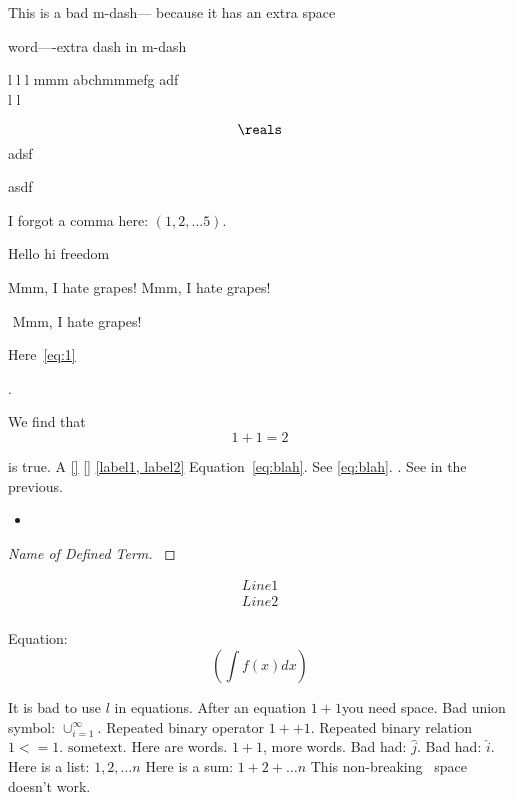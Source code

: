 This is a bad m-dash---
because it has an extra space

word----extra dash in m-dash
  
 \hat{\jmath} l  l l    mmm abchmmmefg adf
 $$ $$  
 l  l

 
  \[{\reals}\]  
adsf  
    
 
asdf

I forgot a comma here: $(1, 2, \dots 5)$.

\cite{} 

Hello hi freedom

Mmm, I hate grapes! 
Mmm, I hate grapes! 

$$ $$ $$ $$
$ $
Mmm, I hate grapes! 


Here~\cref{eq:1}

\[
    
\].

We find that
\[
    1 + 1 = 2
\] 

is true.
 A 
\ref{}
\cref{} 
\cite{}
\label{\alpha}
\label{a,b} 
\cref{label1, label2}
Equation~\ref{eq:blah}.
See \cref{eq:blah}.
\cite[Theorem 1]{a}. 
See in the previous.


\begin{itemize}
    a
    \item  
\end{itemize}

\begin{proof}[Name of Defined Term]
    \label{def:Name of Defined Term}
    

\end{proof}
\begin{align}
    Line 1 \\
    Line 2 \\
\end{align}

Equation:
\[
    (\int f(x) dx)
\] 


It is bad to use $l$ in equations.
After an equation $1+1$you need space.
Bad union symbol: $\cup_{i=1}^\infty$.
Repeated binary operator $1 ++ 1$.
Repeated binary relation $1 <= 1$.
$\mathrm{some text}$.
Here are words. $1 + 1$, more words.
Bad had: $\hat{j}$.
Bad had: $\hat i$.
Here is a list: $1, 2, \dots n$
Here is a sum: $1 + 2 + \dots n$
This non-breaking~ space doesn't work.

